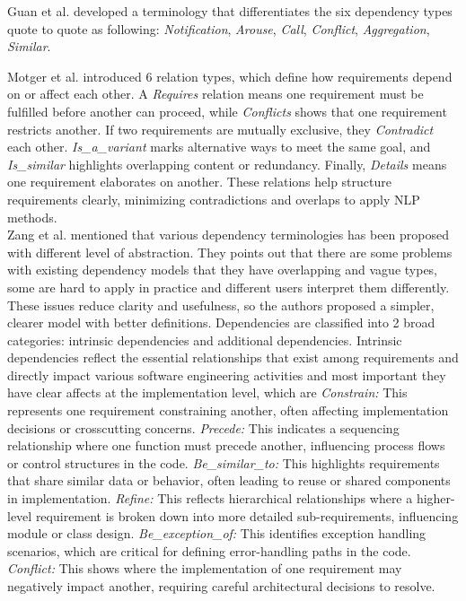 \documentclass[a4paper, 11 pt, leqno, titlepage = true, toc=bib, oneside]{scrbook}
\begin{document}
Guan et al. \cite{DBLP:journals/ijautcomp/GuanCX24} developed a terminology that differentiates the six dependency types quote to quote as following: \textit{Notification}, \textit{Arouse}, \textit{Call}, \textit{Conflict},  \textit{Aggregation}, \textit{Similar}.

Motger et al. \cite{Motger2024} introduced 6 relation types, which define how requirements depend on or affect each other. A \textit{Requires} relation means one requirement must be fulfilled before another can proceed, while \textit{Conflicts} shows that one requirement restricts another. If two requirements are mutually exclusive, they \textit{Contradict} each other. \textit{Is\_a\_variant} marks alternative ways to meet the same goal, and \textit{Is\_similar} highlights overlapping content or redundancy. Finally, \textit{Details} means one requirement elaborates on another. These relations help structure requirements clearly, minimizing contradictions and overlaps to apply NLP methods. \\
Zang et al. \cite{ZhangInvestigatingDep} mentioned that various dependency terminologies has been proposed with different level of abstraction. They points out that there are some problems with existing dependency models that they have overlapping and vague types, some are hard to apply in practice and different users interpret them differently. These issues reduce clarity and usefulness, so the authors proposed a simpler, clearer model with better definitions. Dependencies are classified into 2 broad categories: intrinsic dependencies and additional dependencies. Intrinsic dependencies reflect the essential relationships that exist among requirements and directly impact various software engineering activities and most important they have clear affects at the implementation level, which are \textit{Constrain:} This represents one requirement constraining another, often affecting implementation decisions or crosscutting concerns. \textit{Precede:} This indicates a sequencing relationship where one function must precede another, influencing process flows or control structures in the code. \textit{Be\_similar\_to:} This highlights requirements that share similar data or behavior, often leading to reuse or shared components in implementation. \textit{Refine:} This reflects hierarchical relationships where a higher-level requirement is broken down into more detailed sub-requirements, influencing module or class design. \textit{Be\_exception\_of:} This identifies exception handling scenarios, which are critical for defining error-handling paths in the code. \textit{Conflict:} This shows where the implementation of one requirement may negatively impact another, requiring careful architectural decisions to resolve.
\end{document}

